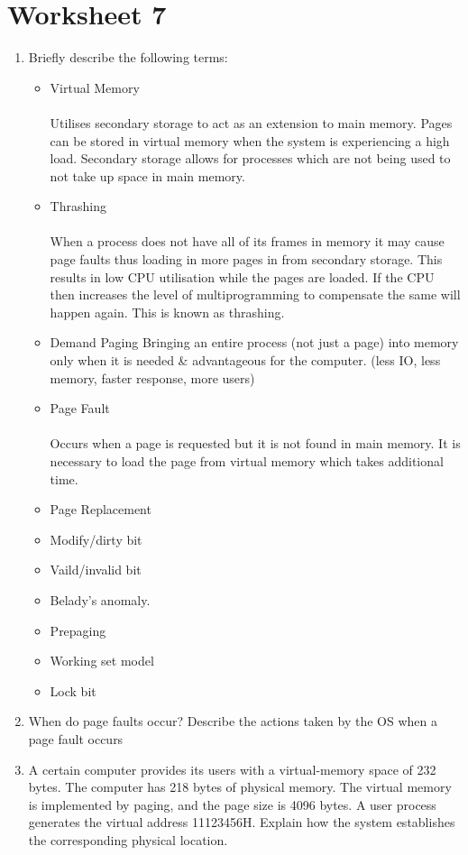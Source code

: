 \documentclass{article}
\newcommand{\answercolor}{Bittersweet}
\newcommand{\answer}[1]{\\\\\textcolor{\answercolor}{#1}\\}
\begin{document}
	\section{Worksheet 7}
	\begin{enumerate}
		\item Briefly describe the following terms:
			\begin{itemize}
				\item Virtual Memory
				\answer{Utilises secondary storage to act as an extension to main memory. Pages can be stored in virtual memory when the system is experiencing a high load. Secondary storage allows for processes which are not being used to not take up space in main memory.}
				\item Thrashing
				\answer{When a process does not have all of its frames in memory it may cause page faults thus loading in more pages in from secondary storage. This results in low CPU utilisation while the pages are loaded. If the CPU then increases the level of multiprogramming to compensate the same will happen again. This is known as thrashing.}
				\item Demand Paging
				\textcolor{Bittersweet}{Bringing an entire process (not just a page) into memory only when it is needed \& advantageous for the computer. (less IO, less memory, faster response, more users)}
				\item Page Fault
				\answer{Occurs when a page is requested but it is not found in main memory. It is necessary to load the page from virtual memory which takes additional time.}
				\item Page Replacement
				\item Modify/dirty bit
				\item Vaild/invalid bit
				\item Belady's anomaly.
				\item Prepaging
				\item Working set model
				\item Lock bit
			\end{itemize}
		\item When do page faults occur? Describe the actions taken by the OS when a page fault occurs
		\item A certain computer provides its users with a virtual-memory space of 232 bytes. The computer has 218 bytes of physical memory. The virtual memory is implemented by paging, and the page size is 4096 bytes. A user process generates the virtual address 11123456H. Explain how the system establishes the corresponding physical location.

\end{enumerate}
\end{document}
